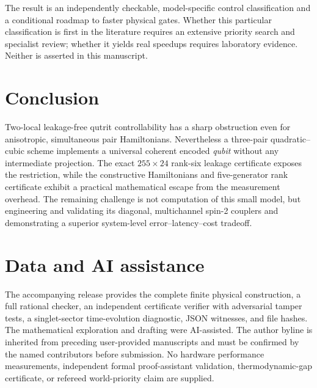 \documentclass[aps,pra,twocolumn,nofootinbib,superscriptaddress,10pt]{revtex4-2}
\begin{document}
The result is an independently checkable, model-specific control classification and a conditional roadmap to faster physical gates. Whether this particular classification is first in the literature requires an extensive priority search and specialist review; whether it yields real speedups requires laboratory evidence. Neither is asserted in this manuscript.

\section{Conclusion}
Two-local leakage-free qutrit controllability has a sharp obstruction even for anisotropic, simultaneous pair Hamiltonians. Nevertheless a three-pair quadratic--cubic scheme implements a universal coherent encoded \emph{qubit} without any intermediate projection. The exact $255\times24$ rank-six leakage certificate exposes the restriction, while the constructive Hamiltonians and five-generator rank certificate exhibit a practical mathematical escape from the measurement overhead. The remaining challenge is not computation of this small model, but engineering and validating its diagonal, multichannel spin-2 couplers and demonstrating a superior system-level error--latency--cost tradeoff.

\section*{Data and AI assistance}
The accompanying release provides the complete finite physical construction, a full rational checker, an independent certificate verifier with adversarial tamper tests, a singlet-sector time-evolution diagnostic, JSON witnesses, and file hashes. The mathematical exploration and drafting were AI-assisted. The author byline is inherited from preceding user-provided manuscripts and must be confirmed by the named contributors before submission. No hardware performance measurements, independent formal proof-assistant validation, thermodynamic-gap certificate, or refereed world-priority claim are supplied.

\appendix
\end{document}
